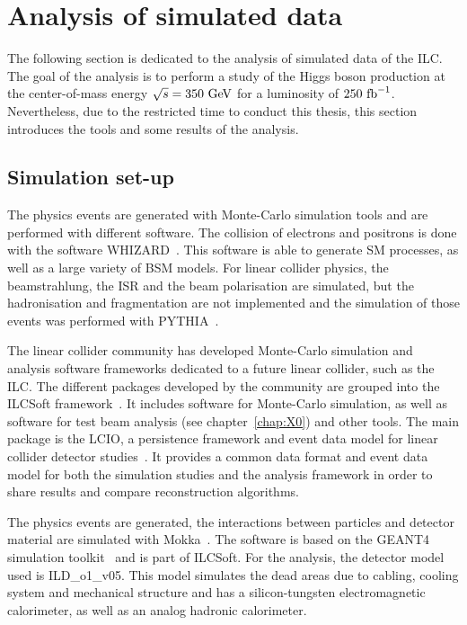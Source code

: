   \section{Analysis of simulated data}
  
    The following section is dedicated to the analysis of simulated data of the \gls{ILC}.
    The goal of the analysis is to perform a study of the Higgs boson production at the center-of-mass energy $\sqrt{s} = 350~\rm{GeV}$ for a luminosity of $250~\rm{fb}^{-1}$.
    Nevertheless, due to the restricted time to conduct this thesis, this section introduces the tools and some results of the analysis.

  \subsection{Simulation set-up}  
  \label{subsec:ILCSOFT}

    The physics events are generated with Monte-Carlo simulation tools and are performed with different software.
    The collision of electrons and positrons is done with the software WHIZARD~\cite{WHIZARD}.
    This software is able to generate \gls{SM} processes, as well as a large variety of \gls{BSM} models.
    For linear collider physics, the beamstrahlung, the \gls{ISR} and the beam polarisation are simulated, but the hadronisation and fragmentation are not implemented and the simulation of those events was performed with PYTHIA~\cite{PYTHIA}.
  
    The linear collider community has developed Monte-Carlo simulation and analysis software frameworks dedicated to a future linear collider, such as the \gls{ILC}. 
    The different packages developed by the community are grouped into the ILCSoft framework~\cite{ilcsoft}.
    It includes software for Monte-Carlo simulation, as well as software for test beam analysis (see chapter~\ref{chap:X0}) and other tools.
    The main package is the \gls{LCIO}, a persistence framework and event data model for linear collider detector studies~\cite{lcio}. 
    It provides a common data format and event data model for both the simulation studies and the analysis framework in order to share results and compare reconstruction algorithms.

    The physics events are generated, the interactions between particles and detector material are simulated with Mokka~\cite{Mokka}.
    The software is based on the GEANT4 simulation toolkit~\cite{GEANT4} and is part of ILCSoft.
    For the analysis, the detector model used is ILD\_o1\_v05.
    This model simulates the dead areas due to cabling, cooling system and mechanical structure and has a silicon-tungsten electromagnetic calorimeter, as well as an analog hadronic calorimeter.
    
